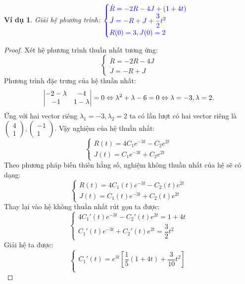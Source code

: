 \documentclass[a4paper]{article}
\newtheorem{example}{Ví dụ}
\begin{document}
\begin{example}
Giải hệ phương trình: $\textcolor{blue}{\begin{cases}
    \dot{R} = -2R - 4J + (1 + 4t) \\
    \dot{J} = -R + J + \dfrac{3}{2} t^2 \\
    R(0) = 3, J(0) = 2
\end{cases}}$
\end{example}
\begin{proof}
    Xét hệ phương trình thuần nhất tương ứng: 
    $$\begin{cases}
    \dot{R}= -2R - 4J\\
    \dot{J}=-R + J
    \end{cases}$$
    Phương trình đặc trưng của hệ thuần nhất: 
    $$\begin{vmatrix}
-2 - \lambda & -4 \\
-1 &  1 - \lambda
\end{vmatrix} = 0 \Leftrightarrow \lambda^{2}  
 + \lambda - 6= 0 \Leftrightarrow \lambda = -3, \lambda = 2.\\$$
Ứng với hai vector riêng $\lambda_1 = -3, \lambda_2 = 2$ ta có lần lượt có hai vector riêng là $\begin{pmatrix}
    4 \\
    1
\end{pmatrix},  \begin{pmatrix}
    -1 \\
    1
\end{pmatrix}$.  Vậy nghiệm của hệ thuần nhất: 
$$
\begin{cases}
    R(t) = 4C_1e^{-3t} - C_2e^{2t} \\
    J(t) = C_1e^{-3t} + C_2e^{2t}
\end{cases}$$
Theo phương pháp biến thiên hằng số, nghiệm không thuần nhất của hệ sẽ có dạng: 
$$\begin{cases}
    R(t) = 4C_1(t)e^{-3t} - C_2(t)e^{2t} \\
    J(t) = C_1(t)e^{-3t} + C_2(t)e^{2t}
\end{cases}$$
Thay lại vào hệ không thuần nhất rút gọn ta được: 
$$\begin{cases}
    4C_1'(t)e^{-3t} - C_2'(t)e^{2t} = 1 + 4t \\
    C_1'(t)e^{-3t} + C_2'(t)e^{2t} = \dfrac{3}{2}t^2
\end{cases}$$
Giải hệ ta được: 
$$\begin{cases}
    C_1'(t) = e^{3t}\left[\dfrac{1}{5}(1+4t) + \dfrac{3}{10}t^2 \right]\\

\end{cases}$$
\end{proof}
\end{document}

